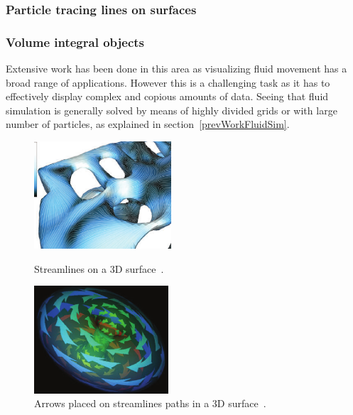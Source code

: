 \documentclass[11pt]{report}
\begin{document}
\subsubsection{Particle tracing lines on surfaces}

\subsubsection{Volume integral objects}

Extensive work has been done in this area as visualizing fluid movement has a broad range of applications.
However this is a challenging task as it has to effectively display complex and copious amounts of data.
Seeing that fluid simulation is generally solved by means of highly divided grids or with large number of particles, as explained in section~\ref{prevWorkFluidSim}.\\

\begin{figure}
	\centering
	\begin{minipage}[t]{.45\textwidth}
		\centering
		\includegraphics[width=.8\textwidth,height=4cm]{images/streamLinesSpencer}
		\caption{Streamlines on a 3D surface~\cite{Spencer2009}.}
		\label{fig:streamLines}
	\end{minipage}\hfill
	\begin{minipage}[t]{.45\textwidth}
		\centering
		\includegraphics[width=.8\textwidth,height=4cm]{images/streamArrows}
		\caption{Arrows placed on streamlines paths in a 3D surface~\cite{loffelmann1998}.}
		\label{fig:streamArrows}
	\end{minipage}
\end{figure}
\end{document}
